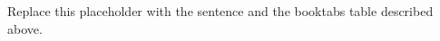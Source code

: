 \documentclass{article}
\begin{document}
Replace this placeholder with the sentence and the booktabs table
described above.
\end{document}
